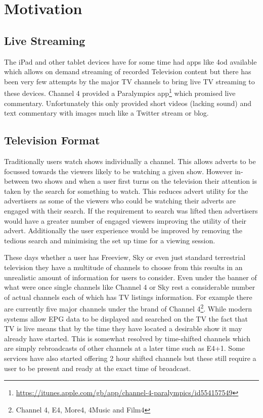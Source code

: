 \section{Motivation}

\subsection{Live Streaming}
The iPad and other tablet devices have for some time had apps like 4od available which allows on demand streaming of recorded Television content but there has been very few attempts by the major TV channels to bring live TV streaming to these devices. Channel 4 provided a Paralympics app\footnote{\url{https://itunes.apple.com/gb/app/channel-4-paralympics/id554157549}} which promised live commentary. Unfortunately this only provided short videos (lacking sound) and text commentary with images much like a Twitter stream or blog.

\subsection{Television Format}
Traditionally users watch shows individually a channel. This allows adverts to be focussed towards the viewers likely to be watching a given show. However in-between two shows and when a user first turns on the television their attention is taken by the search for something to watch. This reduces advert utility for the advertisers as some of the viewers who could be watching their adverts are engaged with their search. If the requirement to search was lifted then advertisers would have a greater number of engaged viewers improving the utility of their advert. Additionally the user experience would be improved by removing the tedious search and minimising the set up time for a viewing session.

These days whether a user has Freeview, Sky or even just standard terrestrial television they have a multitude of channels to choose from this results in an unrealistic amount of information for users to consider\citep{informationOverload}. Even under the banner of what were once single channels like Channel 4 or Sky rest a considerable number of actual channels each of which has TV listings information. For example there are currently five major channels under the brand of Channel 4\footnote{Channel 4, E4, More4, 4Music and Film4}. While modern systems allow EPG data to be displayed and searched on the TV the fact that TV is live means that by the time they have located a desirable show it may already have started. This is somewhat resolved by time-shifted channels which are simply rebroadcasts of other channels at a later time such as E4+1. Some services have also started offering 2 hour shifted channels but these still require a user to be present and ready at the exact time of broadcast.

